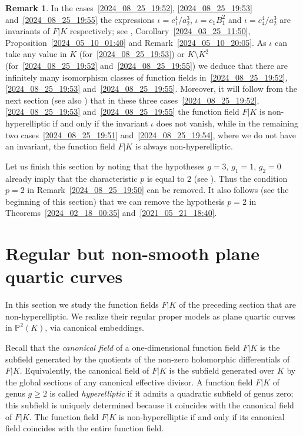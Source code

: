 \documentclass[12pt,reqno]{amsart}
\theoremstyle{definition}
\newtheorem{rem}[thm]{Remark}
\newcommand{\PP}{\mathbb{P}}
\begin{document}
\begin{rem}
In the cases~\ref{2024_08_25_19:52}, \ref{2024_08_25_19:53} and~\ref{2024_08_25_19:55} the expressions $\iota = c_1^4 / a_2^3$, $\iota = c_1 B_1^2$ and $\iota = c_4^4/a_2^3$ are invariants of $F|K$ respectively; 
see \cite[Proposition~3.5]{HiSt23}, Corollary~\ref{2024_03_25_11:50}, Proposition~\ref{2024_05_10_01:40} and Remark~\ref{2024_05_10_20:05}.
As $\iota$ can take any value in $K$ (for~\ref{2024_08_25_19:53}) or $K \setminus K^2$ (for~\ref{2024_08_25_19:52} and~\ref{2024_08_25_19:55}) we deduce that there are infinitely many isomorphism classes of function fields in~\ref{2024_08_25_19:52}, \ref{2024_08_25_19:53} and~\ref{2024_08_25_19:55}.
Moreover, it will follow from the next section (see also \cite[Section~4]{HiSt23}) that in these three cases~\ref{2024_08_25_19:52}, \ref{2024_08_25_19:53} and~\ref{2024_08_25_19:55} the function field $F|K$ is non-hyperelliptic if and only if the invariant $\iota$ does not vanish, while in the remaining two cases~\ref{2024_08_25_19:51} and~\ref{2024_08_25_19:54}, where we do not have an invariant, the function field $F|K$ is always non-hyperelliptic.
\end{rem}

Let us finish this section by noting that the hypotheses $g=3$, $g_1=1$, $g_2=0$ already imply that the characteristic $p$ is equal to $2$ (see \cite[Corollary~2.7~(iii)]{HiSt22}).
Thus the condition $p=2$ in Remark~\ref{2024_08_25_19:50} can be removed. 
It also follows (see the beginning of this section) that we can remove the hypothesis $p=2$ in Theorems~\ref{2024_02_18_00:35} and~\ref{2021_05_21_18:40}.






\section{Regular but non-smooth plane quartic curves}
\label{2024_04_05_18:30}

In this section we study the function fields $F|K$ of the preceding section that are non-hyperelliptic. 
We realize their regular proper models as plane quartic curves in $\PP^2(K)$, via canonical embeddings.

Recall that the \emph{canonical field} of a one-dimensional function field $F|K$ is the subfield generated by the quotients of the non-zero holomorphic differentials of $F|K$. 
Equivalently, the canonical field of $F|K$ is the subfield generated over $K$ by the global sections of any canonical effective divisor.
A function field $F|K$ of genus $g\geq 2$ is called \emph{hyperelliptic} if it admits a quadratic subfield of genus zero;
this subfield is uniquely determined because it coincides with the canonical field of $F|K$.
The function field $F|K$ is non-hyperelliptic if and only if its canonical field coincides with the entire function field.
\end{document}
